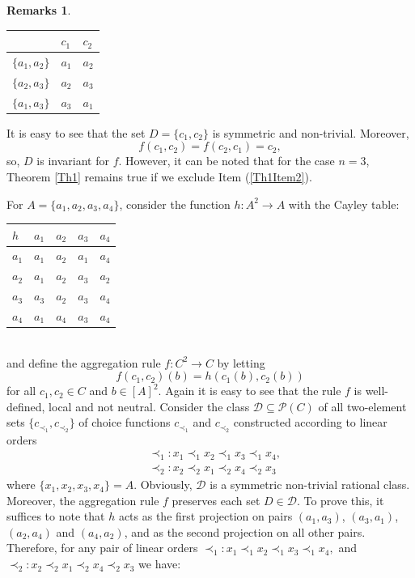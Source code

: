 \documentclass[graybox]{SNmult}
\theoremstyle{definition}
\newtheorem*{rems}{Remarks}
\begin{document}
\begin{rems}
\begin{enumerate}
		\begin{table}[h!]\centering
			\begin{tabular}{l|l|l}
				&  $c_1$ & $c_2$ \\
				\hline
				$\{a_1, a_2\}$ &  $a_1$ & $a_2$ \\
				\hline
				$\{a_2, a_3\}$ &  $a_2$ & $a_3$ \\
				\hline
				$\{a_1, a_3\}$ &  $a_3$ & $a_1$ \\
			\end{tabular}
		\end{table}
		It is easy to see that the set $D=\{c_1, c_2\}$ is symmetric and non-trivial. Moreover, 
		$$
		f(c_1, c_2)=f(c_2, c_1)=c_2,
		$$	
		so, $D$ is invariant for $f$. However, it can be noted that for the case $n=3$, Theorem \ref{Th1} remains true if we exclude Item (\ref{Th1Item2}).
		\par For $A=\{a_1, a_2, a_3, a_4\}$, consider the function $h: A^2\to A$ with the Cayley table:
		\begin{table}[h!]\centering
			\begin{tabular}{l|l|l|l|l}
				$h$ &  $a_1$ & $a_2$ & $a_3$ & $a_4$\\ %
				\hline
				$a_1$ &  $a_1$ & $a_2$ & $a_1$& $a_4$\\
				\hline
				$a_2$ &  $a_1$ & $a_2$ & $a_3$& $a_2$\\
				\hline
				$a_3$ &  $a_3$ & $a_2$ & $a_3$& $a_4$\\
				\hline
				$a_4$ &  $a_1$ & $a_4$ & $a_3$& $a_4$\\ %
			\end{tabular}
		\end{table}
		\\and define the aggregation rule $f: C^2\to C$ by letting
		$$
		f(c_1, c_2)(b)=h(c_1(b), c_2(b))
		$$
		for all $c_1, c_2\in C$ and $b\in [A]^2$. Again it is easy to see that the rule $f$ is well-defined, local and not neutral. Consider the class $\mathscr D\subseteq \mathscr P(C)$ of all two-element sets $\{c_{\prec_1}, c_{\prec_2}\}$ of choice functions $c_{\prec_1}$ and $c_{\prec_2}$ constructed according to linear orders 
		\begin{align*}
			& {\prec_1}: x_1\prec_1 x_2\prec_1 x_3 \prec_1 x_4,\\
			& {\prec_2}: x_2\prec_2 x_1\prec_2 x_4 \prec_2 x_3
		\end{align*}
		where $\{x_1, x_2, x_3, x_4\}=A$. Obviously, $\mathscr D$ is a symmetric non-trivial rational class. Moreover, the aggregation rule $f$ preserves each set $D\in \mathscr D$. To prove this, it suffices to note that $h$ acts as the first projection on pairs $(a_1, a_3)$, $(a_3, a_1)$, $(a_2, a_4)$ and $(a_4, a_2)$, and as the second projection on all other pairs. Therefore, for any pair of linear orders ${\prec_1}: x_1\prec_1 x_2\prec_1 x_3 \prec_1 x_4,$ and ${\prec_2}: x_2\prec_2 x_1\prec_2 x_4 \prec_2 x_3$ we have:

\end{enumerate}
\end{rems}
\end{document}
